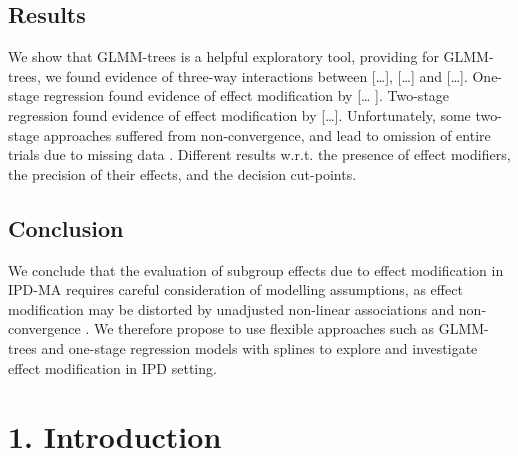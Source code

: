 \documentclass[14pt,]{article}
\let\oldsubparagraph\subparagraph
\renewcommand{\subparagraph}[1]{\oldsubparagraph{#1}\mbox{}}
\begin{document}
\hypertarget{results}{%
\subsection{Results}\label{results}}

We show that GLMM-trees is a helpful exploratory tool, providing for
GLMM-trees, we found evidence of three-way interactions between
{[}\ldots{]}, {[}\ldots{]} and {[}\ldots{]}. One-stage regression found
evidence of effect modification by {[}\ldots{} {]}. Two-stage regression
found evidence of effect modification by {[}\ldots{]}. Unfortunately,
some two-stage approaches suffered from non-convergence, and lead to
omission of entire trials due to missing data . Different results w.r.t.
the presence of effect modifiers, the precision of their effects, and
the decision cut-points.

\hypertarget{conclusion}{%
\subsection{Conclusion}\label{conclusion}}

We conclude that the evaluation of subgroup effects due to effect
modification in IPD-MA requires careful consideration of modelling
assumptions, as effect modification may be distorted by unadjusted
non-linear associations and non-convergence . We therefore propose to
use flexible approaches such as GLMM-trees and one-stage regression
models with splines to explore and investigate effect modification in
IPD setting.

\newpage

\hypertarget{section}{%
\subparagraph{}\label{section}}

\hypertarget{introduction}{%
\section{1. Introduction}\label{introduction}}
\end{document}

